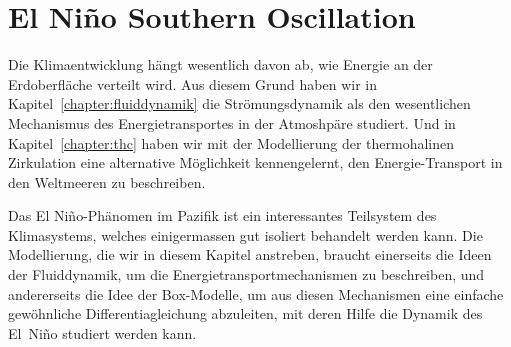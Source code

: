 %
%
%
\chapter{El Niño Southern Oscillation\label{chapter:elnino}}
Die Klimaentwicklung hängt wesentlich davon ab, wie Energie an der
Erdoberfläche verteilt wird.
Aus diesem Grund haben wir in Kapitel~\ref{chapter:fluiddynamik}
die Strömungsdynamik als den wesentlichen Mechanismus des 
Energietransportes in der Atmoshpäre studiert.
Und in Kapitel~\ref{chapter:thc} haben wir mit der Modellierung der
thermohalinen Zirkulation eine alternative Möglichkeit kennengelernt,
den Energie-Transport in den Weltmeeren zu beschreiben.

Das El Niño-Phänomen im Pazifik ist ein interessantes Teilsystem des
Klimasystems, welches einigermassen gut isoliert behandelt werden kann.
Die Modellierung, die wir in diesem Kapitel anstreben, braucht
einerseits die Ideen der Fluiddynamik, um die Energietransportmechanismen
zu beschreiben, und andererseits die Idee der Box-Modelle, um aus diesen
Mechanismen eine einfache gewöhnliche Differentiagleichung abzuleiten,
mit deren Hilfe die Dynamik des El~Niño studiert werden kann.
%
%






